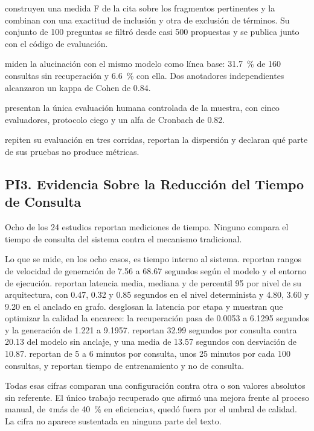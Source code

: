 \documentclass[man,12pt,floatsintext,donotrepeattitle]{apa7}
\begin{document}
\textcite{wojtasik2025} construyen una medida F de la cita sobre los fragmentos pertinentes y la combinan con una exactitud de inclusión y otra de exclusión de términos. Su conjunto de 100 preguntas se filtró desde casi 500 propuestas y se publica junto con el código de evaluación.

\textcite{shaikh2025} miden la alucinación con el mismo modelo como línea base: 31.7~\% de 160 consultas sin recuperación y 6.6~\% con ella. Dos anotadores independientes alcanzaron un kappa de Cohen de 0.84.

\textcite{ekene2025} presentan la única evaluación humana controlada de la muestra, con cinco evaluadores, protocolo ciego y un alfa de Cronbach de 0.82.

\textcite{tamascelli2025} repiten su evaluación en tres corridas, reportan la dispersión y declaran qué parte de sus pruebas no produce métricas.

\subsection{PI3. Evidencia Sobre la Reducción del Tiempo de Consulta}
Ocho de los 24 estudios reportan mediciones de tiempo. Ninguno compara el tiempo de consulta del sistema contra el mecanismo tradicional.

Lo que se mide, en los ocho casos, es tiempo interno al sistema. \textcite{ramli2025} reportan rangos de velocidad de generación de 7.56 a 68.67 segundos según el modelo y el entorno de ejecución. \textcite{stepanov2026} reportan latencia media, mediana y de percentil 95 por nivel de su arquitectura, con 0.47, 0.32 y 0.85 segundos en el nivel determinista y 4.80, 3.60 y 9.20 en el anclado en grafo. \textcite{khasanova2025} desglosan la latencia por etapa y muestran que optimizar la calidad la encarece: la recuperación pasa de 0.0053 a 6.1295 segundos y la generación de 1.221 a 9.1957. \textcite{quincoso2026} reportan 32.99 segundos por consulta contra 20.13 del modelo sin anclaje, y \textcite{shaikh2025} una media de 13.57 segundos con desviación de 10.87. \textcite{rachmat2024} reportan de 5 a 6 minutos por consulta, \textcite{van2025} unos 25 minutos por cada 100 consultas, y \textcite{calfoforo2024} reportan tiempo de entrenamiento y no de consulta.

Todas esas cifras comparan una configuración contra otra o son valores absolutos sin referente. El único trabajo recuperado que afirmó una mejora frente al proceso manual, de «más de 40~\% en eficiencia», quedó fuera por el umbral de calidad. La cifra no aparece sustentada en ninguna parte del texto.
\end{document}
